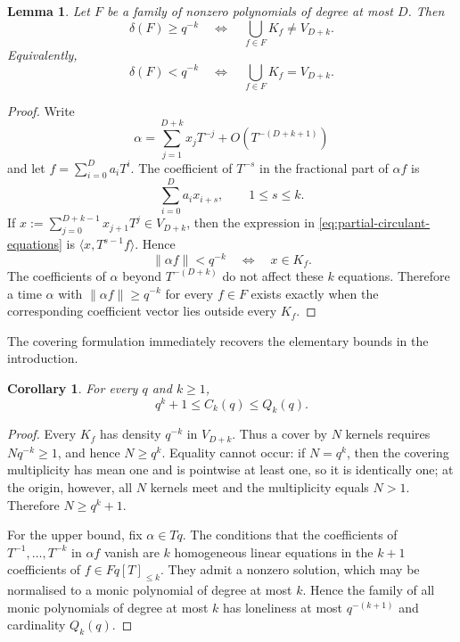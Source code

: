 \documentclass[11pt,reqno]{amsart}
\numberwithin{equation}{section}
\newtheorem{lemma}[lemma]{Lemma}
\newtheorem{corollary}[corollary]{Corollary}
\theoremstyle{definition}
\theoremstyle{remark}
\newcommand{\Fq}{\mathbb F_q}
\newcommand{\Torus}{\mathbb T_q}
\newcommand{\cF}{\mathcal F}
\newcommand{\norm}[1]{\lVert#1\rVert}
\newcommand{\angles}[1]{\langle#1\rangle}
\def\Fq{Fq}%
\def\Torus{Tq}%
\def\mathbb#1{#1}%
\def\mathcal#1{#1}%
\begin{document}
\begin{lemma}\label{lem:covering}
Let $\cF$ be a family of nonzero polynomials of degree at most $D$.  Then
\[
 \delta(\cF)\ge q^{-k}
 \quad\Longleftrightarrow\quad
 \bigcup_{f\in\cF}K_f\ne V_{D+k}.
\]
Equivalently,
\begin{equation}\label{eq:covering-equivalence}
 \delta(\cF)<q^{-k}
 \quad\Longleftrightarrow\quad
 \bigcup_{f\in\cF}K_f=V_{D+k}.
\end{equation}
\end{lemma}

\begin{proof}
Write
\[
 \alpha=\sum_{j=1}^{D+k}x_jT^{-j}
 +O(T^{-(D+k+1)})
\]
and let
$f=\sum_{i=0}^Da_iT^i$.  The coefficient of $T^{-s}$ in the fractional part of $\alpha f$ is
\begin{equation}\label{eq:partial-circulant-equations}
 \sum_{i=0}^Da_ix_{i+s},
 \qquad 1\le s\le k.
\end{equation}
If $x:=\sum_{j=0}^{D+k-1}x_{j+1}T^j\in V_{D+k}$, then the expression in \eqref{eq:partial-circulant-equations} is
$\angles{x,T^{s-1}f}$.  Hence
\[
 \norm{\alpha f}<q^{-k}
 \quad\Longleftrightarrow\quad
 x\in K_f.
\]
The coefficients of $\alpha$ beyond $T^{-(D+k)}$ do not affect these $k$ equations.  Therefore a time $\alpha$ with
$\norm{\alpha f}\ge q^{-k}$ for every $f\in\cF$ exists exactly when the corresponding coefficient vector lies outside every $K_f$.
\end{proof}

The covering formulation immediately recovers the elementary bounds in the introduction.

\begin{corollary}\label{cor:basic-Ck-bounds}
For every $q$ and $k\ge1$,
\begin{equation}\label{eq:basic-Ck-bounds}
 q^k+1\le C_k(q)\le Q_k(q).
\end{equation}
\end{corollary}

\begin{proof}
Every $K_f$ has density $q^{-k}$ in $V_{D+k}$.  Thus a cover by $N$ kernels requires $Nq^{-k}\ge1$, and hence $N\ge q^k$.  Equality cannot occur: if $N=q^k$, then the covering multiplicity has mean one and is pointwise at least one, so it is identically one; at the origin, however, all $N$ kernels meet and the multiplicity equals $N>1$.  Therefore $N\ge q^k+1$.

For the upper bound, fix $\alpha\in\Torus$.  The conditions that the coefficients of
$T^{-1},\ldots,T^{-k}$ in $\alpha f$ vanish are $k$ homogeneous linear equations in the $k+1$ coefficients of
$f\in\Fq[T]_{\le k}$.  They admit a nonzero solution, which may be normalised to a monic polynomial of degree at most $k$.  Hence the family of all monic polynomials of degree at most $k$ has loneliness at most $q^{-(k+1)}$ and cardinality $Q_k(q)$.
\end{proof}
\end{document}
